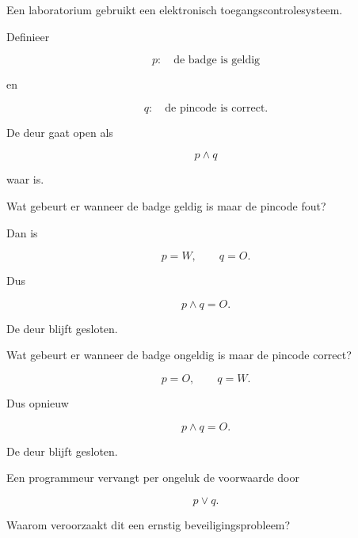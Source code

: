 \documentclass{ximera}
\begin{document}
\begin{oefening}{\oefU \ESS}

Een laboratorium gebruikt een elektronisch toegangscontrolesysteem.

Definieer

\[
p:\quad \text{de badge is geldig}
\]

en

\[
q:\quad \text{de pincode is correct}.
\]

De deur gaat open als

\[
p\land q
\]

waar is.

\begin{question}

Wat gebeurt er wanneer de badge geldig is maar de pincode fout?

\begin{oplossing}

Dan is

\[
p=W,
\qquad
q=O.
\]

Dus

\[
p\land q=O.
\]

De deur blijft gesloten.

\end{oplossing}

\end{question}



\begin{question}

Wat gebeurt er wanneer de badge ongeldig is maar de pincode correct?

\begin{oplossing}

\[
p=O,
\qquad
q=W.
\]

Dus opnieuw

\[
p\land q=O.
\]

De deur blijft gesloten.

\end{oplossing}

\end{question}



\begin{question}

Een programmeur vervangt per ongeluk de voorwaarde door

\[
p\lor q.
\]

Waarom veroorzaakt dit een ernstig beveiligingsprobleem?


\end{question}
\end{oefening}
\end{document}
